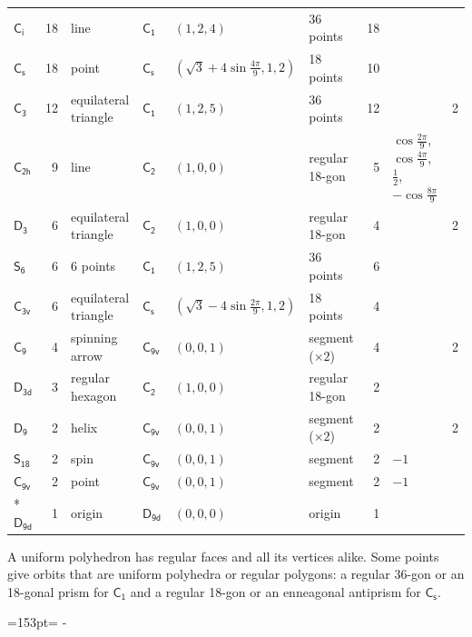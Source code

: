 \documentclass[10pt,a4paper]{article}
\newcommand{\needspace}[1]{\par\penalty-100\begingroup\dimen0=#1\relax\dimen2=\pagegoal
  \advance\dimen2-\pagetotal\ifdim\dimen0>\dimen2\relax\ifdim\dimen2>0pt\vfil\break\fi\fi
  \endgroup}
\numberwithin{equation}{section}
\newcommand{\grp}[1]{\mathsf{#1}}
\newlength{\fillwidth}\newlength{\cellwidth}\newlength{\colwidth}
\begin{document}
{{\begin{longtable}{@{}lrllllr>{\RaggedRight\arraybackslash}p{\fillwidth}r@{}}
\href{S2.pdf}{$\grp{C_{i}}$} & 18 & line & \href{C1.pdf}{$\grp{C_{1}}$} & $(1, 2, 4)$ & 36 points & 18 &  & \\
\href{C1v.pdf}{$\grp{C_{s}}$} & 18 & point & \href{C1v.pdf}{$\grp{C_{s}}$} & $(\sqrt{3} + 4\sin\tfrac{4\pi}{9}, 1, 2)$ & 18 points & 10 &  & \\
\href{C3.pdf}{$\grp{C_{3}}$} & 12 & equilateral triangle & \href{C1.pdf}{$\grp{C_{1}}$} & $(1, 2, 5)$ & 36 points & 12 &  & 2\\
\href{C2h.pdf}{$\grp{C_{2h}}$} & 9 & line & \href{C2.pdf}{$\grp{C_{2}}$} & $(1, 0, 0)$ & regular 18-gon & 5 & ${\cos\tfrac{2\pi}{9}}$, ${\cos\tfrac{4\pi}{9}}$, ${\tfrac{1}{2}}$, ${-\cos\tfrac{8\pi}{9}}$ & \\
\href{D3.pdf}{$\grp{D_{3}}$} & 6 & equilateral triangle & \href{C2.pdf}{$\grp{C_{2}}$} & $(1, 0, 0)$ & regular 18-gon & 4 &  & 2\\
\href{S6.pdf}{$\grp{S_{6}}$} & 6 & 6 points & \href{C1.pdf}{$\grp{C_{1}}$} & $(1, 2, 5)$ & 36 points & 6 &  & \\
\href{C3v.pdf}{$\grp{C_{3v}}$} & 6 & equilateral triangle & \href{C1v.pdf}{$\grp{C_{s}}$} & $(\sqrt{3} - 4\sin\tfrac{2\pi}{9}, 1, 2)$ & 18 points & 4 &  & \\
\href{C9.pdf}{$\grp{C_{9}}$} & 4 & spinning arrow & \href{C9v.pdf}{$\grp{C_{9v}}$} & $(0, 0, 1)$ & segment (${\times}2$) & 4 &  & 2\\
\href{D3d.pdf}{$\grp{D_{3d}}$} & 3 & regular hexagon & \href{C2.pdf}{$\grp{C_{2}}$} & $(1, 0, 0)$ & regular 18-gon & 2 &  & \\
\href{D9.pdf}{$\grp{D_{9}}$} & 2 & helix & \href{C9v.pdf}{$\grp{C_{9v}}$} & $(0, 0, 1)$ & segment (${\times}2$) & 2 &  & 2\\
\href{S18.pdf}{$\grp{S_{18}}$} & 2 & spin & \href{C9v.pdf}{$\grp{C_{9v}}$} & $(0, 0, 1)$ & segment & 2 & ${-1}$ & \\
\href{C9v.pdf}{$\grp{C_{9v}}$} & 2 & point & \href{C9v.pdf}{$\grp{C_{9v}}$} & $(0, 0, 1)$ & segment & 2 & ${-1}$ & \\*
\href{D9d.pdf}{$\grp{D_{9d}}$} & 1 & origin & \href{D9d.pdf}{$\grp{D_{9d}}$} & $(0, 0, 0)$ & origin & 1 &  & \\
\bottomrule\end{longtable}}}
A uniform polyhedron has regular faces and all its vertices alike. Some points give orbits that are uniform polyhedra or regular polygons: a regular 36-gon or an 18-gonal prism for \href{C1.pdf}{$\grp{C_{1}}$} and a regular 18-gon or an enneagonal antiprism for \href{C1v.pdf}{$\grp{C_{s}}$}.
\needspace{153pt}
\end{document}
